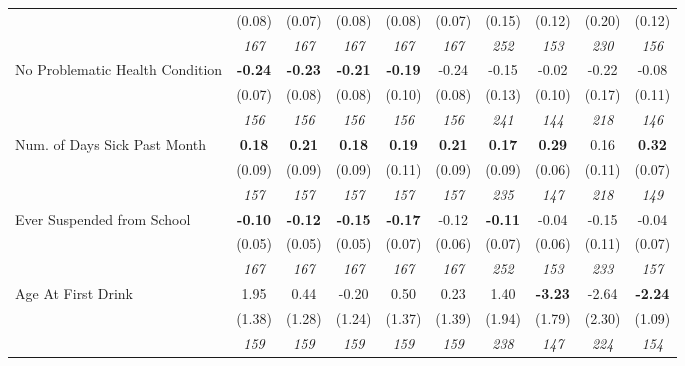 \begin{tabular}{l c c c c c c c c c}
& (0.08) & (0.07) & (0.08) & (0.08) & (0.07) & (0.15) & (0.12) & (0.20) & (0.12) \\
& \textit{ 167 } & \textit{ 167 } & \textit{ 167 } & \textit{ 167 } & \textit{ 167 } & \textit{ 252 } & \textit{ 153 } & \textit{ 230 } & \textit{ 156 } \\
No Problematic Health Condition & \textbf{ -0.24 } & \textbf{ -0.23 } & \textbf{ -0.21 } & \textbf{-0.19} & -0.24 & -0.15 & -0.02 & -0.22 & -0.08 \\
& (0.07) & (0.08) & (0.08) & (0.10) & (0.08) & (0.13) & (0.10) & (0.17) & (0.11) \\
& \textit{ 156 } & \textit{ 156 } & \textit{ 156 } & \textit{ 156 } & \textit{ 156 } & \textit{ 241 } & \textit{ 144 } & \textit{ 218 } & \textit{ 146 } \\
Num. of Days Sick Past Month & \textbf{ 0.18 } & \textbf{ 0.21 } & \textbf{ 0.18 } & \textbf{0.19} & \textbf{0.21} & \textbf{ 0.17 } & \textbf{0.29} & 0.16 & \textbf{0.32} \\
& (0.09) & (0.09) & (0.09) & (0.11) & (0.09) & (0.09) & (0.06) & (0.11) & (0.07) \\
& \textit{ 157 } & \textit{ 157 } & \textit{ 157 } & \textit{ 157 } & \textit{ 157 } & \textit{ 235 } & \textit{ 147 } & \textit{ 218 } & \textit{ 149 } \\
Ever Suspended from School & \textbf{ -0.10 } & \textbf{ -0.12 } & \textbf{ -0.15 } & \textbf{-0.17} & -0.12 & \textbf{ -0.11 } & -0.04 & -0.15 & -0.04 \\
& (0.05) & (0.05) & (0.05) & (0.07) & (0.06) & (0.07) & (0.06) & (0.11) & (0.07) \\
& \textit{ 167 } & \textit{ 167 } & \textit{ 167 } & \textit{ 167 } & \textit{ 167 } & \textit{ 252 } & \textit{ 153 } & \textit{ 233 } & \textit{ 157 } \\
Age At First Drink & 1.95 & 0.44 & -0.20 & 0.50 & 0.23 & 1.40 & \textbf{-3.23} & -2.64 & \textbf{-2.24} \\
& (1.38) & (1.28) & (1.24) & (1.37) & (1.39) & (1.94) & (1.79) & (2.30) & (1.09) \\
& \textit{ 159 } & \textit{ 159 } & \textit{ 159 } & \textit{ 159 } & \textit{ 159 } & \textit{ 238 } & \textit{ 147 } & \textit{ 224 } & \textit{ 154 } \\
\bottomrule
\end{tabular}
